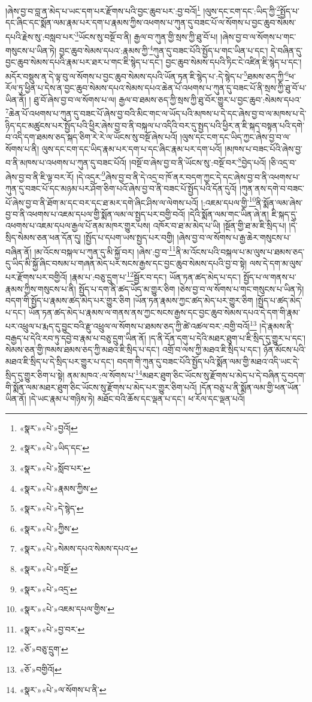།ཞེས་བྱ་བ་བླ་ན་མེད་པ་ཡང་དག་པར་རྫོགས་པའི་བྱང་ཆུབ་པར་:བྱ་བའོ།\footnote{«སྣར་»«པེ་»བྱའོ།} །ལུས་དང་ངག་དང་:ཡིད་ཀྱི་\footnote{«སྣར་»«པེ་»ཡིད་དང་}སྤྱོད་པ་དང་ཞིང་དང་སྨོན་ལམ་རྣམ་པར་དག་པ་རྣམས་ཀྱིས་འཕགས་པ་ཀུན་དུ་བཟང་པོ་ལ་སོགས་པ་བྱང་ཆུབ་སེམས་དཔའི་རྗེས་སུ་:བསླབ་པར་\footnote{«སྣར་»«པེ་»སློབ་པར་}ཡོངས་སུ་བསྔོ་བ་ནི། རྒྱལ་བ་ཀུན་གྱི་སྲས་ཀྱི་ཐུ་བོ་པ། །ཞེས་བྱ་བ་ལ་སོགས་པ་གང་གསུངས་པ་ཡིན་ཏེ། བྱང་ཆུབ་སེམས་དཔའ་:རྣམས་ཀྱི་\footnote{«སྣར་»«པེ་»རྣམས་ཀྱིས་}ཀུན་དུ་བཟང་པོའི་སྤྱོད་པ་གང་ཡིན་པ་དང་། དེ་བཞིན་དུ་བྱང་ཆུབ་སེམས་དཔའི་རྣམ་པར་ཐར་པ་གང་ཇི་སྙེད་པ་དང་། བྱང་ཆུབ་སེམས་དཔའི་ཏིང་ངེ་འཛིན་ཇི་སྙེད་པ་དང་། མདོར་བསྡུས་ན་དེ་ལྟ་བུ་ལ་སོགས་པ་བྱང་ཆུབ་སེམས་དཔའི་ཡོན་ཏན་ཇི་སྙེད་པ་:དེ་སྙེད་པ་\footnote{«སྣར་»«པེ་»དེ་སྙེད་}ཐམས་ཅད་ཀྱི་\footnote{«སྣར་»«པེ་»ཀྱིས་}ཕ་རོལ་ཏུ་ཕྱིན་པ་དེས་ན་བྱང་ཆུབ་སེམས་དཔའ་སེམས་དཔའ་ཆེན་པོ་འཕགས་པ་ཀུན་དུ་བཟང་པོ་ནི་སྲས་ཀྱི་ཐུ་བོ་པ་ཡིན་ནོ། །
ཐུ་བོ་ཞེས་བྱ་བ་ལ་སོགས་པ་ལ། རྒྱལ་བ་ཐམས་ཅད་ཀྱི་སྲས་ཀྱི་ཐུ་བོར་གྱུར་པ་བྱང་ཆུབ་:སེམས་དཔའ་\footnote{«སྣར་»«པེ་»སེམས་དཔའ་སེམས་དཔའ་}ཆེན་པོ་འཕགས་པ་ཀུན་དུ་བཟང་པོ་ཞེས་བྱ་བའི་མིང་གང་ལ་ཡོད་པའི་མཁས་པ་དེ་དང་ཞེས་བྱ་བ་ལ་མཁས་པ་དེ་ཉིད་དང་མཚུངས་པར་སྤྱོད་པའི་ཕྱིར་ཞེས་བྱ་བ་ནི་བསྐལ་པ་འདིའི་བར་དུ་སྤྱད་པའི་ཕྱིར་ན་ཇི་སྐད་བསྟན་པའི་དགེ་བ་འདི་དག་ཐམས་ཅད་སྐད་ཅིག་རེ་རེ་ལ་ཡོངས་སུ་བསྔོ་ཞེས་པའོ། །ལུས་དང་ངག་དང་ཡིད་ཀྱང་ཞེས་བྱ་བ་ལ་སོགས་པ་ནི། ལུས་དང་ངག་དང་ཡིད་རྣམ་པར་དག་པ་དང་ཞིང་རྣམ་པར་དག་པའོ། །མཁས་པ་བཟང་པོའི་ཞེས་བྱ་བ་ནི་མཁས་པ་འཕགས་པ་ཀུན་དུ་བཟང་པོའོ། །བསྔོ་བ་ཞེས་བྱ་བ་ནི་ཡོངས་སུ་:བསྔོ་བར་\footnote{«སྣར་»«པེ་»བསྔོ་}བྱེད་པའོ། །ཅི་འདྲ་བ་ཞེས་བྱ་བ་ནི་ཇི་ལྟ་བར་རོ། །དེ་འདྲར་\footnote{«སྣར་»«པེ་»འདྲ་}ཞེས་བྱ་བ་ནི་དེ་འདྲ་བ་ཁོ་ནར་བདག་ཀྱང་དེ་དང་ཞེས་བྱ་བ་ནི་འཕགས་པ་ཀུན་དུ་བཟང་པོ་དང་མཉམ་པར་ཤོག་ཅིག་པའོ་ཞེས་བྱ་བ་ནི་བཟང་པོ་སྤྱོད་པའི་དོན་དུའོ། །ཀུན་ནས་དགེ་བ་བཟང་པོ་ཞེས་བྱ་བ་ནི་ཐོག་མ་དང་བར་དང་ཐ་མར་དགེ་ཞིང་ཤིས་ལ་ལེགས་པའོ། །:འཇམ་དཔལ་གྱི་\footnote{«སྣར་»«པེ་»འཇམ་དཔལ་གྱིས་}ནི་སྨོན་ལམ་ཞེས་བྱ་བ་ནི་འཕགས་པ་འཇམ་དཔལ་གྱི་སྨོན་ལམ་ལ་སྤྱད་པར་བགྱི་བའོ། །དེའི་སྨོན་ལམ་གང་ཡིན་ཞེ་ན། ཇི་སྐད་དུ་འཕགས་པ་འཇམ་དཔལ་རྒྱལ་པོ་ནམ་མཁར་གྱུར་པས། འཁོར་བ་ཐ་མ་མེད་པ་ཡི། །སྔོན་གྱི་ཐ་མ་ཇི་སྲིད་པ། །དེ་སྲིད་སེམས་ཅན་ཕན་དོན་དུ། །སྤྱོད་པ་དཔག་ཡས་སྤྱད་པར་བགྱི། །ཞེས་བྱ་བ་ལ་སོགས་པ་རྒྱ་ཆེར་གསུངས་པ་བཞིན་ནོ། །མ་འོངས་བསྐལ་པ་ཀུན་དུ་མི་སྐྱོ་བར། །ཞེས་:བྱ་བ་\footnote{«སྣར་»«པེ་»བྱ་བར་}ནི་མ་འོངས་པའི་བསྐལ་པ་མ་ལུས་པ་ཐམས་ཅད་དུ་ཡིད་མི་སྐྱོ་ཞིང་བསམ་པ་གཞན་མེད་པར་སངས་རྒྱས་དང་བྱང་ཆུབ་སེམས་དཔའི་བྱ་བ་སྟེ། ལས་དེ་དག་མ་ལུས་པར་རྫོགས་པར་བགྱིའོ། །རྣམ་པ་:བཅུ་དྲུག་པ་\footnote{«ཅོ་»བཅུ་དྲུག་}སྦྱོར་བ་དང་། ཡོན་ཏན་ཚད་མེད་པ་དང་། སྤྱོད་པ་ལ་གནས་པ་རྣམས་ཀྱིས་གསུངས་པ་ནི། སྤྱོད་པ་དག་ནི་ཚད་ཡོད་མ་གྱུར་ཅིག །ཅེས་བྱ་བ་ལ་སོགས་པ་གང་གསུངས་པ་ཡིན་ཏེ། བདག་གི་སྤྱོད་པ་རྣམས་ཚད་མེད་པར་གྱུར་ཅིག །ཡོན་ཏན་རྣམས་ཀྱང་ཚད་མེད་པར་གྱུར་ཅིག །སྤྱོད་པ་ཚད་མེད་པ་དང་། ཡོན་ཏན་ཚད་མེད་པ་རྣམས་ལ་གནས་ནས་ཀྱང་སངས་རྒྱས་དང་བྱང་ཆུབ་སེམས་དཔའ་དེ་དག་གི་རྣམ་པར་འཕྲུལ་པ་རྨད་དུ་བྱུང་བའི་རྫུ་འཕྲུལ་ལ་སོགས་པ་ཐམས་ཅད་ཀྱི་ཚེ་འཚལ་བར་:བགྱི་བའོ།\footnote{«ཅོ་»བགྱིའོ།} །དེ་རྣམས་ནི་བརྒྱད་པ་དེའི་རབ་ཏུ་དབྱེ་བ་རྣམ་པ་བཅུ་དྲུག་ཡིན་ནོ། །ད་ནི་དོན་དགུ་པ་དེའི་མཐར་ཐུག་པ་ཇི་སྲིད་དུ་གྱུར་པ་དང་། སེམས་ཅན་གྱི་ཁམས་ཐམས་ཅད་ཀྱི་མཐའ་ཇི་སྲིད་པ་དང་། འགྲོ་བ་ལས་ཀྱི་མཐའ་ཇི་སྲིད་པ་དང་། ཉོན་མོངས་པའི་མཐའ་ཇི་སྲིད་པ་དེ་སྲིད་པར་གྱུར་པ་དང་། བདག་གི་ཀུན་དུ་བཟང་པོའི་སྤྱོད་པའི་སྨོན་ལམ་གྱི་མཐའ་འདི་ཡང་དེ་སྲིད་དུ་གྱུར་ཅིག་པ་སྟེ། ནམ་མཁའ་:ལ་སོགས་པ་\footnote{«སྣར་»«པེ་»ལ་སོགས་པ་ནི་}མཐར་ཐུག་ཅིང་ཡོངས་སུ་རྫོགས་པ་མེད་པ་དེ་བཞིན་དུ་བདག་གི་སྨོན་ལམ་མཐར་ཐུག་ཅིང་ཡོངས་སུ་རྫོགས་པ་མེད་པར་གྱུར་ཅིག་པའོ། །དོན་བཅུ་པ་ནི་སྨོན་ལམ་གྱི་ཕན་ཡོན་ཡིན་ནོ། །དེ་ཡང་རྣམ་པ་གཉིས་ཏེ། མཐོང་བའི་ཆོས་དང་ལྡན་པ་དང་། ཕ་རོལ་དང་ལྡན་པའོ། 